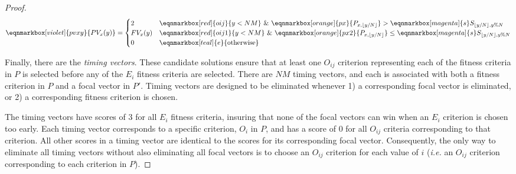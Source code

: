 \documentclass[sigconf]{acmart}
\begin{document}
\begin{proof}
\begin{equation}
\eqnmarkbox[violet]{pvxy}{PV_{x}(y)} = \begin{cases} 
                2 & \eqnmarkbox[red]{oij}{y < NM} \text{ }  \& \text{ }  \eqnmarkbox[orange]{px}{P_{x,\lfloor y/N \rfloor}} > \eqnmarkbox[magenta]{s}{S_{\lfloor y/N \rfloor, y\%N}}  \\
                FV_x(y) & \eqnmarkbox[red]{oij1}{y < NM} \text{ }  \& \text{ }  \eqnmarkbox[orange]{px2}{P_{x,\lfloor y/N \rfloor}} \leq \eqnmarkbox[magenta]{s}{S_{\lfloor y/N \rfloor, y\%N}} \\
                0 & \eqnmarkbox[teal]{e}{\text{otherwise}}
            \end{cases}
\end{equation}

\vspace{2em}

Finally, there are the \textit{timing vectors}. These candidate solutions ensure that at least one $O_{ij}$ criterion representing each of the fitness criteria in $P$ is selected before any of the $E_i$ fitness criteria are selected. There are $NM$ timing vectors, and each is associated with both a fitness criterion in $P$ and a focal vector in $P'$. Timing vectors are designed to be eliminated whenever 1) a corresponding focal vector is eliminated, or 2) a corresponding fitness criterion is chosen.

The timing vectors have scores of 3 for all $E_i$ fitness criteria, insuring that none of the focal vectors can win when an $E_i$ criterion is chosen too early. Each timing vector corresponds to a specific criterion, $O_i$ in $P$, and has a score of 0 for all $O_{ij}$ criteria corresponding to that criterion. All other scores in a timing vector are identical to the scores for its corresponding focal vector. Consequently, the only way to eliminate all timing vectors without also eliminating all focal vectors is to choose an $O_{ij}$ criterion for each value of $i$ (\textit{i.e.} an $O_{ij}$ criterion corresponding to each criterion in $P$).


\end{proof}
\end{document}

